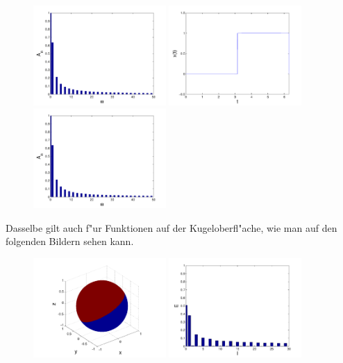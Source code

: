 \begin{refsection}
\begin{figure}
\includegraphics[width=0.45\textwidth]{kugel/kSpektrum/Rechteck3_2.pdf}
\includegraphics[width=0.45\textwidth]{kugel/kSpektrum/Rechteck4_1.pdf}
\includegraphics[width=0.45\textwidth]{kugel/kSpektrum/Rechteck4_2.pdf}
\label{skript:Spektrum1}%
\end{figure}
Dasselbe gilt auch f"ur Funktionen auf der Kugeloberfl"ache, wie man
auf den folgenden Bildern sehen kann.
\begin{figure}
\centering
\includegraphics[width=0.45\textwidth]{kugel/kSpektrum/Kugel_1_1.pdf}
\includegraphics[width=0.45\textwidth]{kugel/kSpektrum/Kugel_1_2.pdf}

\end{figure}
\end{refsection}
